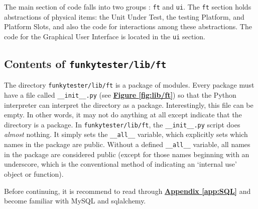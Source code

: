 \documentclass{report}
\begin{document}
The main section of code falls into two groups : \texttt{ft} and \texttt{ui}. The \texttt{ft} section holds abstractions of physical items: the Unit Under Test, the testing Platform, and Platform Slots, and also the code for interactions among these abstractions. The code for the Graphical User Interface is located in the \texttt{ui} section.

\subsection{Contents of \texttt{funkytester/lib/ft}}
The directory \texttt{funkytester/lib/ft} is a package of modules. Every package must have a file called \texttt{\_\_init\_\_.py} (see \hyperref[fig:lib/ft]{\textbf{Figure \ref{fig:lib/ft}}}) so that the Python interpreter can interpret the directory as a package. Interestingly, this file can be empty. In other words, it may not do anything at all except indicate that the directory is a package. In \texttt{funkytester/lib/ft}, the \texttt{\_\_init\_\_.py} script does \textit{almost} nothing. It simply sets the \texttt{\_\_all\_\_} variable, which explicitly sets which names in the package are public. Without a defined \texttt{\_\_all\_\_} variable, all names in the package are considered public (except for those names beginning with an underscore, which is the conventional method of indicating an `internal use' object or function).

Before continuing, it is recommend to read through \hyperref[app:SQL]{\textbf{Appendix \ref{app:SQL}}} and become familiar with MySQL and sqlalchemy. \\

	\begin{minipage}{\linewidth}
		\label{fig:lib/ft}
	\end{minipage}
		\vspace{5pt}%
\end{document}
